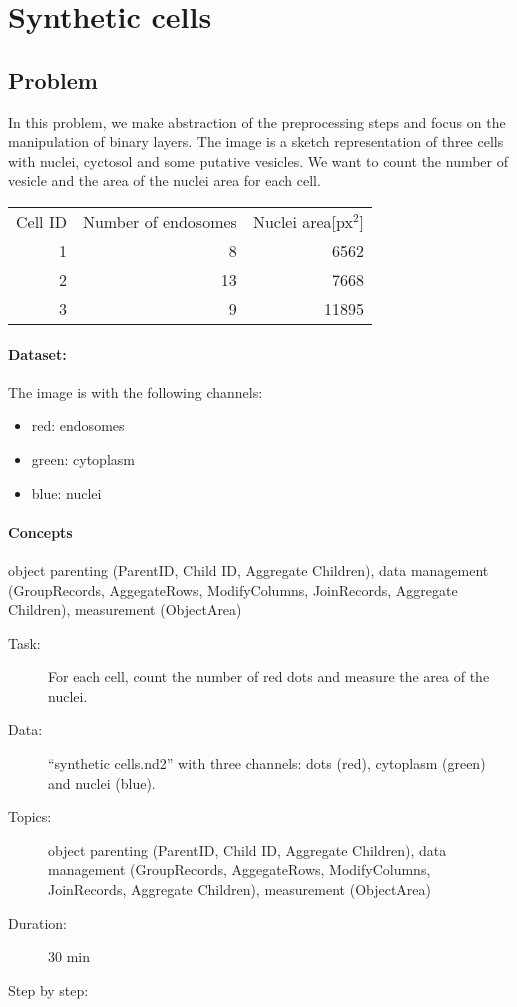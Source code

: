 \section{Synthetic cells}

\subsection{Problem}
In this problem, we make abstraction of the preprocessing steps and focus on the manipulation of binary layers. The image is a sketch representation of three cells with nuclei, cyctosol and some putative vesicles. We want to count the number of vesicle and the area of the nuclei area for each cell.

\begin{center}
\begin{tabular}{rrr}
    Cell ID& Number of endosomes& Nuclei area[px$^2$]\\
    1&8&6562\\
    2&13&7668\\
    3&9&11895\\
\end{tabular}   
\end{center}

\paragraph{Dataset:} The image is  with the following channels:
\begin{itemize}\setlength\itemsep{0em}
    \item red: endosomes
    \item green: cytoplasm
    \item blue: nuclei
\end{itemize}

\paragraph{Concepts} object parenting (ParentID, Child ID, Aggregate Children), data management (GroupRecords, AggegateRows, ModifyColumns, JoinRecords, Aggregate Children), measurement (ObjectArea)

\begin{description}
    \item[Task:] For each cell, count the number of red dots and measure the area of the nuclei.
    \item[Data:] ``synthetic cells.nd2'' with three channels: dots (red), cytoplasm (green) and nuclei (blue). 
    \item[Topics:] object parenting (ParentID, Child ID, Aggregate Children), data management (GroupRecords, AggegateRows, ModifyColumns, JoinRecords, Aggregate Children), measurement (ObjectArea)
    \item[Duration:] 30 min
    \item[Step by step:]
\end{description}

